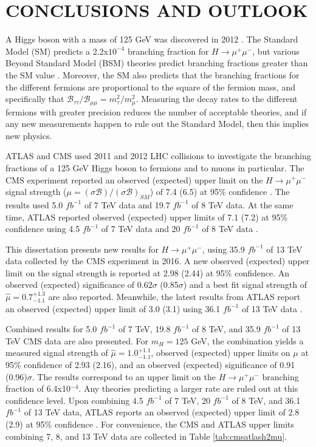 \chapter{CONCLUSIONS AND OUTLOOK} \label{conclusions}

A Higgs boson with a mass of 125 GeV was discovered in 2012 \cite{atlasdiscovery,cmsdiscovery2012,cmsdiscovery2013}. The Standard Model (SM) predicts a 2.2x$10^{-4}$ branching fraction for $H\rightarrow\mu^+\mu^-$, but various Beyond Standard Model (BSM) theories predict branching fractions greater than the SM value \cite{gtsm1, gtsm2, gtsm3}. Moreover, the SM also predicts that the branching fractions for the different fermions are proportional to the square of the fermion mass, and specifically that $\mathcal{B}_{\tau\tau}/\mathcal{B}_{\mu\mu} = m^2_\tau/m^2_\mu$. Measuring the decay rates to the different fermions with greater precision reduces the number of acceptable theories, and if any new measurements happen to rule out the Standard Model, then this implies new physics.  

ATLAS and CMS used 2011 and 2012 LHC collisions to investigate the branching fractions of a 125 GeV Higgs boson to fermions and to muons in particular. The CMS experiment reported an observed (expected) upper limit on the $H\rightarrow\mu^+\mu^-$ signal strength ($\mu = (\sigma\mathcal{B})/(\sigma\mathcal{B})_{SM}$) of 7.4 (6.5) at 95\% confidence \cite{cmshmumu2012}. The results used 5.0 $fb^{-1}$ of 7 TeV data and 19.7 $fb^{-1}$ of 8 TeV data. At the same time, ATLAS reported observed (expected) upper limits of 7.1 (7.2) at 95\% confidence using 4.5 $fb^{-1}$ of 7 TeV data and 20 $fb^{-1}$ of 8 TeV data \cite{atlashmumu2012}. 

This dissertation presents new results for $H\rightarrow\mu^+\mu^-$, using 35.9 $fb^{-1}$ of 13 TeV data collected by the CMS experiment in 2016. A new observed (expected) upper limit on the signal strength is reported at 2.98 (2.44) at 95\% confidence. An observed (expected) significance of 0.62$\sigma$ (0.85$\sigma$)  and a best fit signal strength of $\hat{\mu} = 0.7^{+1.3}_{-1.1}$ are also reported. Meanwhile, the latest results from ATLAS report an observed (expected) upper limit of 3.0 (3.1) using 36.1 $fb^{-1}$ of 13 TeV data \cite{atlashmumu2017}. 

Combined results for 5.0 $fb^{-1}$ of 7 TeV, 19.8 $fb^{-1}$ of 8 TeV, and 35.9 $fb^{-1}$ of 13 TeV CMS data are also presented. For $m_H=125$ GeV, the combination yields a measured signal strength of $\hat{\mu} = 1.0^{+1.1}_{-1.1}$, observed (expected) upper limits on $\mu$ at 95\% confidence of 2.93 (2.16), and an observed (expected) significance of 0.91 (0.96)$\sigma$. The results correspond to an upper limit on the $H\rightarrow\mu^+\mu^-$ branching fraction of 6.4x10$^{-4}$. Any theories predicting a larger rate are ruled out at this confidence level. Upon combining 4.5 $fb^{-1}$ of 7 TeV, 20 $fb^{-1}$ of 8 TeV, and 36.1 $fb^{-1}$ of 13 TeV data, ATLAS reports an observed (expected) upper limit of 2.8 (2.9) at 95\% confidence \cite{atlashmumu2017}. For convenience, the CMS and ATLAS upper limits combining 7, 8, and 13 TeV data are collected in Table \ref{tab:cmsatlash2mu}.

